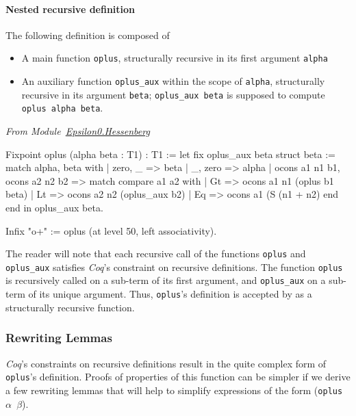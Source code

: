 \paragraph{Nested recursive definition}
\label{sec:orgheadline83}

The following definition is composed of 
\begin{itemize}
\item A main function \texttt{oplus}, structurally recursive in its 
first argument \texttt{alpha}
\item An auxiliary function \texttt{oplus\_aux} within the scope of \texttt{alpha},
structurally recursive in its argument \texttt{beta};  \texttt{oplus\_aux beta} 
   is supposed to compute  \texttt{oplus alpha beta}.
\end{itemize}
  
\vspace{4pt}
\emph{From Module~\href{../theories/html/hydras.Epsilon0.Hessenberg.html\#oplus}{Epsilon0.Hessenberg}}

\label{sect:infix-oplus}

\begin{Coqsrc}
Fixpoint oplus (alpha beta : T1) : T1 :=
  let fix oplus_aux beta {struct beta} :=
      match alpha, beta with
        | zero, _ => beta
        | _,  zero => alpha
        | ocons a1 n1 b1, ocons a2 n2 b2 =>
          match compare a1 a2 with
            |  Gt => ocons a1 n1 (oplus b1 beta)
            |  Lt => ocons a2 n2 (oplus_aux b2)
            |  Eq => ocons a1 (S (n1 + n2)%
          end
      end
  in oplus_aux beta.

Infix "o+" := oplus  (at level 50, left associativity).
\end{Coqsrc}


The reader will note that each recursive call of the functions
\texttt{oplus} and \texttt{oplus\_aux} satisfies \emph{Coq}'s constraint
on recursive definitions. The function \texttt{oplus} is recursively called on a sub-term of its first argument,
and \texttt{oplus\_aux} on a sub-term of its unique argument.
Thus, \texttt{oplus}'s definition is accepted by \coq{} as a structurally recursive function.

\subsubsection{Rewriting Lemmas}
\label{sec:orgheadline86}

\emph{Coq}'s constraints on recursive definitions result in 
the quite  complex form of \texttt{oplus}'s definition.
Proofs of properties of this function can be simpler if we
 derive a few  rewriting lemmas that will help to simplify 
expressions of the form (\texttt{oplus $\alpha$ $\beta$}).

